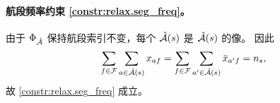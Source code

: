 \paragraph*{航段频率约束 \eqref{constr:relax.seg_freq}。}
由于 $\Phi_{\hat{\mathcal{A}}}$ 保持航段索引不变，每个 $\hat{\mathcal{A}}(s)$ 是 $\full{\segArcSet{s}}$ 的像。
因此
\[
    \sum_{f\in\fleetSet}\sum_{a\in\segArcSet{s}}\fleetAssignVar_{af}
    = \sum_{f\in\fleetSet}\sum_{a'\in\full{\segArcSet{s}}}\bar{\fleetAssignVar}_{a'f}
    = \freq_s,
\]
故 \eqref{constr:relax.seg_freq} 成立。